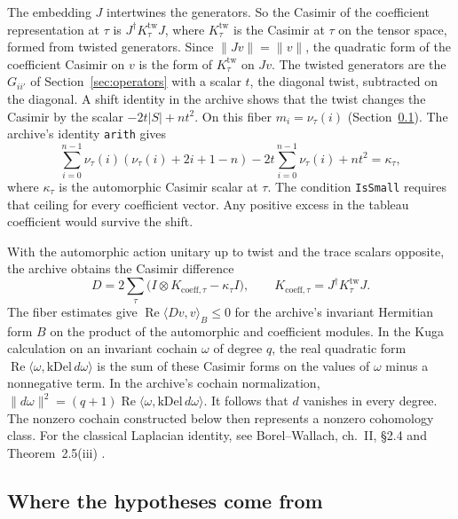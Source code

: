 \documentclass[11pt]{amsart}
\newcommand{\lean}[1]{\texttt{#1}}
\theoremstyle{definition}
\theoremstyle{remark}
\begin{document}
The embedding \(J\) intertwines the generators. So the Casimir of the
coefficient representation at \(\tau\) is \(J^\dagger K^{\mathrm{tw}}_\tau J\),
where \(K^{\mathrm{tw}}_\tau\) is the Casimir at \(\tau\) on the tensor
space, formed from twisted generators. Since \(\|Jv\|=\|v\|\), the quadratic
form of the coefficient Casimir on \(v\) is the form of
\(K^{\mathrm{tw}}_\tau\) on \(Jv\). The twisted generators are the
\(G_{ii'}\) of Section~\ref{sec:operators} with a scalar \(t\), the diagonal
twist, subtracted on the diagonal. A shift identity in the archive shows
that the twist changes the Casimir by the scalar \(-2t|S|+nt^2\). On this fiber \(m_i=\nu_\tau(i)\) (Section~\ref{sec:supply}). The archive's
identity \lean{arith} gives
\[
\sum_{i=0}^{n-1}\nu_\tau(i)(\nu_\tau(i)+2i+1-n)
       -2t\sum_{i=0}^{n-1}\nu_\tau(i)+nt^2=\kappa_\tau,
\]
where \(\kappa_\tau\) is the automorphic Casimir scalar at \(\tau\).
The condition \lean{IsSmall} requires that ceiling for every coefficient
vector. Any positive excess in the tableau coefficient would survive
the shift.

With the automorphic action unitary up to twist and the trace scalars
opposite, the archive obtains the Casimir difference
\[
D=2\sum_\tau\bigl(I\otimes K_{\mathrm{coeff},\tau}-\kappa_\tau I\bigr),
\qquad K_{\mathrm{coeff},\tau}=J^\dagger K^{\mathrm{tw}}_\tau J.
\]
The fiber estimates give \(\operatorname{Re}\langle Dv,v\rangle_B\le0\) for
the archive's invariant Hermitian form \(B\) on the product of the
automorphic and coefficient modules. In the Kuga calculation on an
invariant cochain \(\omega\) of degree \(q\), the real quadratic form
\(\operatorname{Re}\langle\omega,\mathrm{kDel}\,d\omega\rangle\) is the sum of these
Casimir forms on the values of \(\omega\) minus a nonnegative term.
In the archive's cochain normalization,
\(\|d\omega\|^2=(q+1)\operatorname{Re}\langle\omega,\mathrm{kDel}\,d\omega\rangle\).
It follows that \(d\) vanishes in every degree. The
nonzero cochain constructed below then represents a nonzero cohomology
class. For the classical Laplacian identity, see Borel--Wallach,
ch.~II, \S 2.4 and Theorem~2.5(iii) \cite{BorelWallach}.

\subsection{Where the hypotheses come from}\label{sec:supply}
\end{document}

